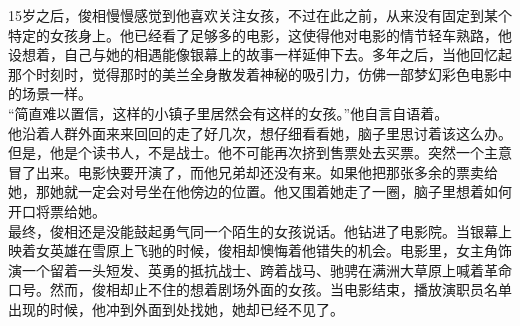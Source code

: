 15岁之后，俊相慢慢感觉到他喜欢关注女孩，不过在此之前，从来没有固定到某个特定的女孩身上。他已经看了足够多的电影，这使得他对电影的情节轻车熟路，他设想着，自己与她的相遇能像银幕上的故事一样延伸下去。多年之后，当他回忆起那个时刻时，觉得那时的美兰全身散发着神秘的吸引力，仿佛一部梦幻彩色电影中的场景一样。\\

“简直难以置信，这样的小镇子里居然会有这样的女孩。”他自言自语着。\\

他沿着人群外面来来回回的走了好几次，想仔细看看她，脑子里思讨着该这么办。但是，他是个读书人，不是战士。他不可能再次挤到售票处去买票。突然一个主意冒了出来。电影快要开演了，而他兄弟却还没有来。如果他把那张多余的票卖给她，那她就一定会对号坐在他傍边的位置。他又围着她走了一圈，脑子里想着如何开口将票给她。\\

最终，俊相还是没能鼓起勇气同一个陌生的女孩说话。他钻进了电影院。当银幕上映着女英雄在雪原上飞驰的时候，俊相却懊悔着他错失的机会。电影里，女主角饰演一个留着一头短发、英勇的抵抗战士、跨着战马、驰骋在满洲大草原上喊着革命口号。然而，俊相却止不住的想着剧场外面的女孩。当电影结束，播放演职员名单出现的时候，他冲到外面到处找她，她却已经不见了。\\
